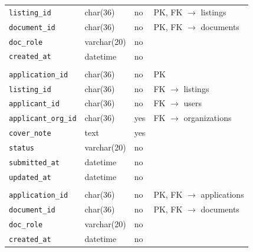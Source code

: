 {\begin{longtable}{L{4.2cm}L{3.4cm}L{1.1cm}L{5.0cm}}
\texttt{listing\_id} & char(36) & no & PK, FK $\rightarrow$ listings\\
\texttt{document\_id} & char(36) & no & PK, FK $\rightarrow$ documents\\
\texttt{doc\_role} & varchar(20) & no & \\
\texttt{created\_at} & datetime & no & \\
\\
\texttt{application\_id} & char(36) & no & PK\\
\texttt{listing\_id} & char(36) & no & FK $\rightarrow$ listings\\
\texttt{applicant\_id} & char(36) & no & FK $\rightarrow$ users\\
\texttt{applicant\_org\_id} & char(36) & yes & FK $\rightarrow$ organizations\\
\texttt{cover\_note} & text & yes & \\
\texttt{status} & varchar(20) & no & \\
\texttt{submitted\_at} & datetime & no & \\
\texttt{updated\_at} & datetime & no & \\
\\
\texttt{application\_id} & char(36) & no & PK, FK $\rightarrow$ applications\\
\texttt{document\_id} & char(36) & no & PK, FK $\rightarrow$ documents\\
\texttt{doc\_role} & varchar(20) & no & \\
\texttt{created\_at} & datetime & no & \\
\hline
\end{longtable}}
